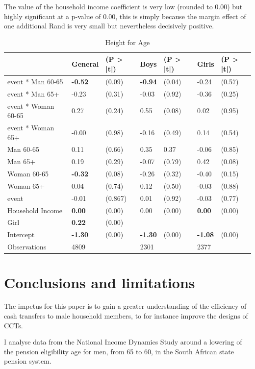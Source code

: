 \documentclass[a4paper,british]{article}\usepackage[]{graphicx}\usepackage[]{color}
\providecommand{\tabularnewline}{\\}
\begin{document}
The value of the household income coefficient is very low (rounded
to 0.00) but highly significant at a p-value of 0.00, this is simply
because the margin effect of one additional Rand is very small but
nevertheless decisively positive.

\begin{table}[H]
\caption{Height for Age}

\begin{centering}
\label{tab:HAZ-full}
\par\end{centering}
\centering{}%
\begin{tabular}{l|ll|ll|ll}
\hline 
 &
General &
(P > |t|) &
Boys &
(P > |t|) &
Girls &
(P > |t|)\tabularnewline
\hline 
event {*} Man 60-65 &
\textbf{-0.52} &
(0.09) &
\textbf{-0.94} &
\multirow{1}{*}{(0.04)} &
-0.24 &
(0.57)\tabularnewline
event {*} Man 65+ &
-0.23 &
(0.31) &
-0.03 &
(0.92) &
-0.36 &
(0.25)\tabularnewline
event {*} Woman 60-65 &
0.27 &
(0.24) &
0.55 &
(0.08) &
0.02 &
(0.95)\tabularnewline
event {*} Woman 65+ &
-0.00 &
(0.98) &
-0.16 &
(0.49) &
0.14 &
(0.54)\tabularnewline
Man 60-65 &
0.11 &
(0.66) &
0.35 &
0.37 &
-0.06 &
(0.85)\tabularnewline
Man 65+ &
0.19 &
(0.29) &
-0.07 &
(0.79) &
0.42 &
(0.08)\tabularnewline
Woman 60-65 &
\textbf{-0.32} &
(0.08) &
-0.26 &
(0.32) &
-0.40 &
(0.15)\tabularnewline
Woman 65+ &
0.04 &
(0.74) &
0.12 &
(0.50) &
-0.03 &
(0.88)\tabularnewline
event &
-0.01 &
(0.867) &
0.01 &
(0.92) &
-0.03 &
(0.77)\tabularnewline
Household Income &
\textbf{0.00} &
(0.00) &
0.00 &
(0.00) &
\textbf{0.00} &
(0.00)\tabularnewline
Girl &
\textbf{0.22} &
(0.00) &
 &
 &
 &
\tabularnewline
Intercept &
\textbf{-1.30} &
(0.00) &
\textbf{-1.30} &
(0.00) &
\textbf{-1.08} &
(0.00)\tabularnewline
\hline 
Observations &
4809 &
 &
2301 &
 &
2377 &
\tabularnewline
\end{tabular}
\end{table}


\section{Conclusions and limitations}

\label{sec:conclusions}The impetus for this paper is to gain a greater
understanding of the efficiency of cash transfers to male household
members, to for instance improve the designs of CCTs.

I analyse data from the National Income Dynamics Study around a lowering
of the pension eligibility age for men, from 65 to 60, in the South
African state pension system.
\end{document}
